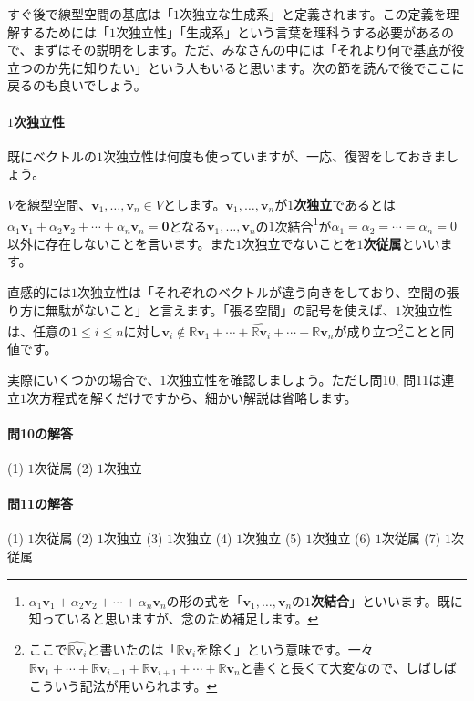 すぐ後で線型空間の基底は「$1$次独立な生成系」と定義されます。この定義を理解するためには「$1$次独立性」「生成系」という言葉を理科うする必要があるので、まずはその説明をします。ただ、みなさんの中には「それより何で基底が役立つのか先に知りたい」という人もいると思います。次の節を読んで後でここに戻るのも良いでしょう。

\paragraph{$1$次独立性} 既にベクトルの$1$次独立性は何度も使っていますが、一応、復習をしておきましょう。

$V$を線型空間、$\bm{v}_1, \ldots, \bm{v}_n \in V$とします。$\bm{v}_1, \ldots, \bm{v}_n$が\textbf{$1$次独立}であるとは$\alpha_1 \bm{v}_1 + \alpha_2 \bm{v}_2 + \cdots + \alpha_n \bm{v}_n = \bm{0}$となる$\bm{v}_1, \ldots, \bm{v}_n$の$1$次結合\footnote{$\alpha_1 \bm{v}_1 + \alpha_2 \bm{v}_2 + \cdots + \alpha_n \bm{v}_n$の形の式を「$\bm{v}_1, \ldots, \bm{v}_n$の\textbf{$1$次結合}」といいます。既に知っていると思いますが、念のため補足します。}が$\alpha_1 = \alpha_2 = \cdots = \alpha_n = 0$以外に存在しないことを言います。また$1$次独立でないことを\textbf{$1$次従属}といいます。

直感的には$1$次独立性は「それぞれのベクトルが違う向きをしており、空間の張り方に無駄がないこと」と言えます。「張る空間」の記号を使えば、$1$次独立性は、任意の$1\leq i \leq n$に対し$\bm{v}_i \not\in \mathbb{R}\bm{v}_1 + \cdots + \hat{\mathbb{R}\bm{v}_i} + \cdots + \mathbb{R}\bm{v}_n$が成り立つ\footnote{ここで$\hat{\mathbb{R}\bm{v}_i}$と書いたのは「$\mathbb{R}\bm{v}_i$を除く」という意味です。一々$\mathbb{R}\bm{v}_1 +\cdots + \mathbb{R}\bm{v}_{i - 1} + \mathbb{R}\bm{v}_{i + 1} + \cdots + \mathbb{R}\bm{v}_n$と書くと長くて大変なので、しばしばこういう記法が用いられます。}ことと同値です。

実際にいくつかの場合で、$1$次独立性を確認しましょう。ただし問10, 問11は連立$1$次方程式を解くだけですから、細かい解説は省略します。

\paragraph{問10の解答} (1) $1$次従属 (2) $1$次独立

\paragraph{問11の解答} (1) $1$次従属 (2) $1$次独立 (3) $1$次独立 (4) $1$次独立 (5) $1$次独立 (6) $1$次従属 (7) $1$次従属

